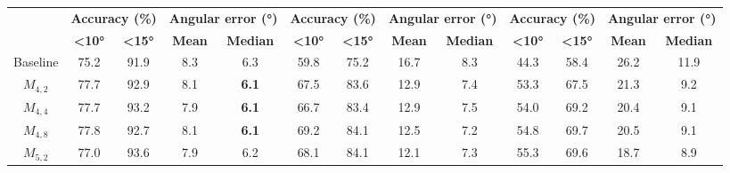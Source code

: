 \begin{table}[t]
{\begin{adjustbox}{width=1.3\textwidth,center}
\begin{tabular}{|c|cccc|cccc|cccc|}
                & \multicolumn{2}{c}{\textbf{Accuracy (\%)}} & \multicolumn{2}{c|}{\textbf{Angular error (°)}} & \multicolumn{2}{c}{\textbf{Accuracy (\%)}} & \multicolumn{2}{c|}{\textbf{Angular error (°)}}& \multicolumn{2}{c}{\textbf{Accuracy (\%)}} & \multicolumn{2}{c|}{\textbf{Angular error (°)}} \\
                
                & \textbf{\textless{}10°} & \textbf{\textless{}15°} & \textbf{Mean} & \textbf{Median} & \textbf{\textless{}10°} & \textbf{\textless{}15°} & \textbf{Mean} & \textbf{Median} & \textbf{\textless{}10°} & \textbf{\textless{}15°} & \textbf{Mean} & \textbf{Median} \\ \hline
                
                Baseline & 75.2                         & 91.9                         & 8.3          & 6.3           & 59.8                         & 75.2                         & 16.7          & 8.3           & 44.3                         & 58.4                         & 26.2          & 11.9          \\
                $M_{4,2}$                        & 77.7                         & 92.9                        & 8.1           & \textbf{6.1}           & 67.5                         & 83.6                         & 12.9          & 7.4           & 53.3                         & 67.5                         & 21.3          & 9.2           \\
                $M_{4,4}$                        & 77.7                         & 93.2                         & 7.9           & \textbf{6.1}           & 66.7                         & 83.4                         & 12.9          & 7.5           & 54.0                         & 69.2                         & 20.4          & 9.1           \\
                $M_{4,8}$                        & 77.8                         & 92.7                         & 8.1           & \textbf{6.1}           & 69.2                         & 84.1                         & 12.5          & 7.2           & 54.8                         & 69.7                        & 20.5          & 9.1           \\
                $M_{5,2}$                        & 77.0                         & 93.6                         & 7.9           & 6.2           & 68.1                         & 84.1                         & 12.1          & 7.3           & 55.3                         & 69.6                         & 18.7          & 8.9           \\

\end{tabular}
\end{adjustbox}}
\end{table}
